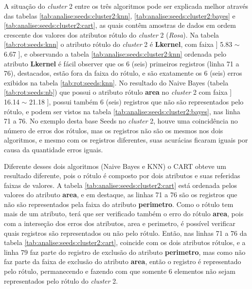 A situação do \textit{cluster} 2 entre os três algoritmos pode ser explicada melhor através das tabelas \ref{tab:analise:seeds:cluster2:knn}, \ref{tab:analise:seeds:cluster2:bayes} e \ref{tab:analise:seeds:cluster2:cart}, as quais contêm amostras de dados em ordem crescente dos valores dos atributos rótulo  do \textit{cluster} 2 (\textit{Rosa}). Na tabela \ref{tab:rot:seeds:knn} o atributo rótulo do \textit{cluster} 2 é \textbf{Lkernel}, com faixa ] 5.83 $\sim$ 6.67 ], e observando a tabela \ref{tab:analise:seeds:cluster2:knn} ordenada pelo atributo \textbf{Lkernel} é fácil observer que os 6 (seis) primeiros registros (linha 71 a 76), destacados, estão fora da faixa do rótulo, e são exatamente os 6 (seis) erros exibidos na tabela \ref{tab:rot:seeds:knn}.
No resultado do Naive Bayes (tabela \ref{tab:rot:seeds:nb}) que possui o atributo rótulo \textbf{area} no \textit{cluster} 2 com faixa ] 16.14 $\sim$  21.18 ], possui também 6 (seis) registros que não são representados pelo rótulo, e podem ser vistos na tabela \ref{tab:analise:seeds:cluster2:bayes}, nas linha 71 a 76. No exemplo desta base Seeds no \textit{cluster} 2, houve uma coincidência no número de erros dos rótulos, mas os registros não são os mesmos nos dois algoritmos, e mesmo com os registros diferentes, suas acurácias ficaram iguais por causa da quantidade erros iguais.

Diferente desses dois algoritmos (Naive Bayes e KNN) o CART obteve um resultado diferente, pois o rótulo é composto por dois atributos e suas referidas faixas de valores. A tabela \ref{tab:analise:seeds:cluster2:cart} está ordenada pelos valores do atributo \textbf{area}, e em destaque, as linhas 71 a 76 são os registros que não são representados pela faixa do atributo \textbf{perimetro}.  Como o rótulo tem mais de um atributo, terá que ser verificado também o erro do rótulo \textbf{area}, pois com  a interseção dos erros dos atributos, area e perimetro, é possível verificar quais registros são representados ou não pelo rótulo. Então, nas linhas 71 a 76 da tabela \ref{tab:analise:seeds:cluster2:cart}, coincide com os dois atributos rótulos, e a linha 79 faz parte do registro de exclusão do atributo \textbf{perimetro}, mas como não faz parte da faixa de exclusão do atributo \textbf{area}, então o registro é representado pelo rótulo, permanecendo e fazendo com que somente 6 elementos não sejam representados pelo rótulo do \textit{cluster} 2.

